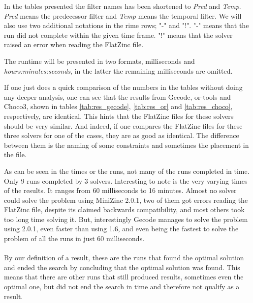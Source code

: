 In the tables presented the filter names has been shortened to \emph{Pred} and \emph{Temp}. \emph{Pred} means the predecessor filter and \emph{Temp} means the temporal filter. We will also use two additional notations in the rime rows; "-" and "!". "-" means that the run did not complete within the given time frame. "!" means that the solver raised an error when reading the FlatZinc file.

The runtime will be presented in two formats, milliseconds and \emph{hours:minutes:seconds}, in the latter the remaining milliseconds are omitted.














If one just does a quick comparison of the numbers in the tables without doing any deeper analysis, one can see that the results from Gecode, or-tools and Choco3, shown in tables \ref{tab:res_gecode}, \ref{tab:res_or} and \ref{tab:res_choco}, respectively, are identical. This hints that the FlatZinc files for these solvers should be very similar. And indeed, if one compares the FlatZinc files for these three solvers for one of the cases, they are as good as identical. The difference between them is the naming of some constraints and sometimes the placement in the file.

As can be seen in the times or the runs, not many of the runs completed in time. Only 9 runs completed by 3 solvers. Interesting to note is the very varying times of the results. It ranges from 60 milliseconds to 16 minutes. Almost no solver could solve the problem using MiniZinc 2.0.1, two of them got errors reading the FlatZinc file, despite its claimed backwards compatibility, and most others took too long time solving it. But, interestingly Gecode manages to solve the problem using 2.0.1, even faster than using 1.6, and even being the fastest to solve the problem of all the runs in just 60 milliseconds.
\\\\
By our definition of a result, these are the runs that found the optimal solution and ended the search by concluding that the optimal solution was found. This means that there are other runs that still produced results, sometimes even the optimal one, but did not end the search in time and therefore not qualify as a result.

